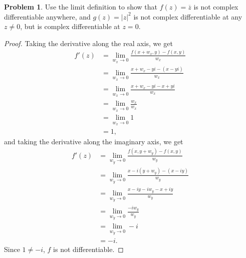 \documentclass[12pt]{article}
\theoremstyle{definition}
\newtheorem{ex}{Problem}
\begin{document}
\begin{ex}
	Use the limit definition to show that $f(z) = \overline{z}$ is not complex differentiable anywhere, and $g(z) = |z|^2$ is not complex differentiable at any $z \neq 0$, but is complex differentiable at $z = 0$.
\end{ex}
\begin{proof}
	Taking the derivative along the real axis, we get
	\begin{align*}
		f'(z) & = \lim_{w_x \to 0} \frac{f(x+w_x, y) - f(x, y)}{w_x}   \\
		      & = \lim_{w_x \to 0} \frac{x + w_x - yi - (x - yi)}{w_x} \\
		      & = \lim_{w_x \to 0} \frac{x + w_x - yi - x + yi}{w_x}   \\
		      & = \lim_{w_x \to 0} \frac{w_x}{w_x}                     \\
		      & = \lim_{w_x \to 0} 1                                   \\
		      & = 1,
	\end{align*}
	and taking the derivative along the imaginary axis, we get
	\begin{align*}
		f'(z) & = \lim_{w_y \to 0} \frac{f(x, y + w_y) - f(x, y)}{w_y}   \\
		      & = \lim_{w_y \to 0} \frac{x - i(y + w_y) - (x - iy)}{w_y} \\
		      & = \lim_{w_y \to 0} \frac{x - iy - iw_y - x + iy}{w_y}    \\
		      & = \lim_{w_y \to 0} \frac{-iw_y}{w_y}                     \\
		      & = \lim_{w_y \to 0} -i                                    \\
		      & = -i.
	\end{align*}
	Since $1 \neq -i$, $f$ is not differentiable.
\end{proof}
\end{document}
